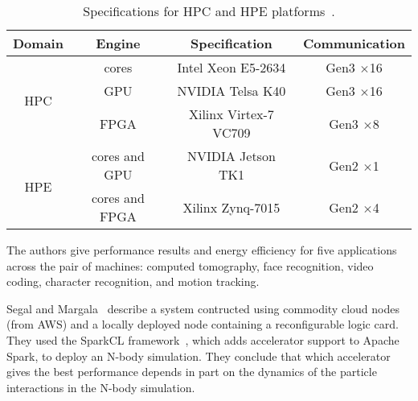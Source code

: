 \begin{table}[ht]
\centering
\caption{Specifications for HPC and HPE platforms~\protect\cite{rpm+15}.}
\label{tbl:hpchpe}
\vspace{0.1in}
\begin{tabular}{c | c | c | c}
Domain & Engine & Specification & Communication \\ \hline
\multirow{3}{*}{HPC} & cores & Intel Xeon E5-2634 & Gen3 $\times$16 \\ \cline{2-4}
 & GPU & NVIDIA Telsa K40 & Gen3 $\times$16 \\ \cline{2-4}
 & FPGA & Xilinx Virtex-7 VC709 & Gen3 $\times$8 \\ \hline
\multirow{2}{*}{HPE} & cores and GPU & NVIDIA Jetson TK1 & Gen2 $\times$1 \\ \cline{2-4}
 & cores and FPGA & Xilinx Zynq-7015 & Gen2 $\times$4
\end{tabular}
\end{table}

The authors give performance results and energy efficiency for five
applications across the pair of machines:
computed tomography, face recognition, video coding, character recognition,
and motion tracking.

Segal and Margala~\cite{sm16} describe a system contructed using commodity cloud
nodes (from AWS) and a locally deployed node containing a reconfigurable logic
card.  They used the SparkCL framework~\cite{sparkcl}, which adds accelerator
support to Apache Spark, to deploy an N-body simulation. They conclude that
which accelerator gives the best performance depends in part on the dynamics
of the particle interactions in the N-body simulation.
